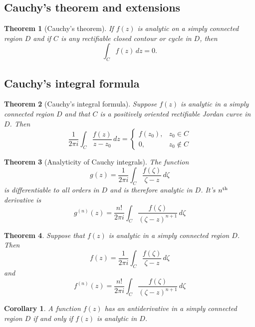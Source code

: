 \documentclass[10pt, oneside, reqno]{amsart}
\theoremstyle{plain}%
\newtheorem{thm}{Theorem}[section]
\newtheorem*{cor}{Corollary}
\theoremstyle{definition}
\theoremstyle{remark}
\newcommand{\dzz}{\, dz}
\newcommand{\nth}{n\textsuperscript{th}}
\begin{document}
\subsection{Cauchy's theorem and extensions} %
\label{sec:cauchy_s_theorem_and_extensions}

\begin{thm}[Cauchy's theorem]
    If $f(z)$ is analytic on a simply connected region $D$ and if $C$ is any rectifiable closed contour or cycle in $D$, then \[
        \int_C f(z) \dzz = 0.
    \]
\end{thm}
    
    
    
\subsection{Cauchy's integral formula} %
\label{sec:cauchy_s_integral_formula}

\begin{thm}[Cauchy's integral formula]
    Suppose $f(z)$ is analytic in a simply connected region $D$ and that $C$ is a positively oriented rectifiable Jordan curve in $D$.  Then \[
        \frac{1}{2 \pi i} \int_C \frac{f(z)}{z - z_0} \dzz = \begin{cases}
            f(z_0), & z_0 \in C \\
            0,      & z_0 \notin C
        \end{cases}
    \]
\end{thm}


\begin{thm}[Analyticity of Cauchy integrals]
    The function \[
        g(z) =  \frac{1}{2 \pi i} \int_C \frac{f(\zeta)}{\zeta- z} \, d \zeta
    \]
    is differentiable to all orders in $D$ and is therefore analytic in $D$.
    It's $\nth$ derivative is \[
        g^{(n)}(z) =    \frac{n!}{2 \pi i} \int_C \frac{f(\zeta)}{(\zeta- z)^{n+1}} \, d \zeta  
    \]
\end{thm}
    
\begin{thm}
    Suppose that $f(z)$ is analytic in a simply connected region $D$.  Then \[
        f(z) =  \frac{1}{2 \pi i} \int_C \frac{f(\zeta)}{\zeta- z} \, d \zeta   
    \] and \[
        f^{(n)}(z) =    \frac{n!}{2 \pi i} \int_C \frac{f(\zeta)}{(\zeta- z)^{n+1}} \, d \zeta  
    \]
\end{thm}

\begin{cor}
    A function $f(z)$ has an antiderivative in a simply connected region $D$ if and only if $f(z)$ is analytic in $D$.
\end{cor}
\end{document}
